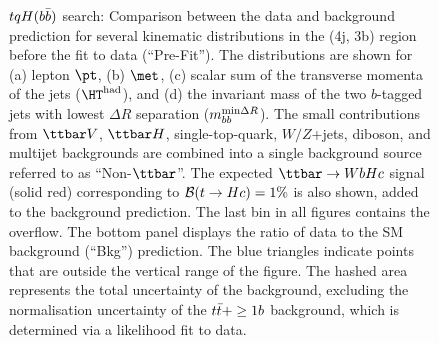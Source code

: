 \begin{figure}[htbp]
\begin{center}
\caption{\small{$tqH(b\bar{b})$ search: Comparison between the data and background prediction for several kinematic 
distributions in the (4j, 3b) region before the fit to data (``Pre-Fit''). 
The distributions are shown for (a) lepton $\pt$, (b) $\met$, (c) scalar sum of the transverse momenta of 
the jets ($\hthad$), and (d) the invariant mass of the two $b$-tagged jets with lowest 
$\Delta R$ separation ($m_{bb}^{\textrm{min}\Delta R}$).
The small contributions from $\ttbar V$, $\ttbar H$, single-top-quark, $W/Z$+jets, diboson, and multijet backgrounds are combined 
into a single background source referred to as ``Non-$\ttbar$''. 
The expected $\Hc$ signal (solid red) corresponding to $\mathcal{B}(t\to Hc)=1\%$ is also shown,
added to the background prediction.
The last bin in all figures contains the overflow.
The bottom panel displays the ratio of data to the SM background (``Bkg'') prediction. 
The blue triangles indicate points that are outside the vertical range of the figure. 
The hashed area represents the total uncertainty of the background, excluding the normalisation uncertainty of the $t\bar{t}+\geq1b$ background, 
which is determined via a likelihood fit to data.}}
\label{fig:Hbb_extravars_4j3b}
\end{center}
\end{figure}

